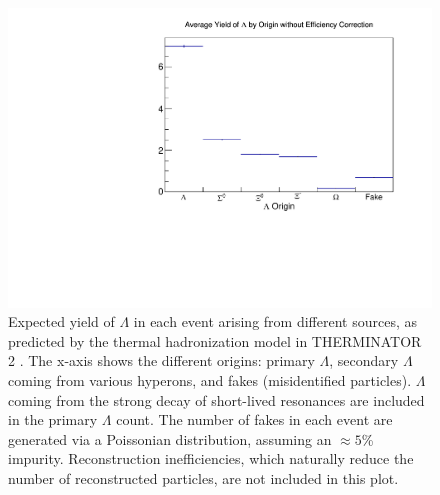 \begin{figure}[hbt]
\includegraphics[width=36pc]{Figures/YieldAndEff/2016-08-06-LambdaYieldsNoEfficiency.pdf}
\caption[$\Lambda$ yields from THERMINATOR 2 without efficiency corrections]{
Expected yield of $\Lambda$ in each event arising from different sources, as predicted by the thermal hadronization model in THERMINATOR 2 \cite{Chojnacki:2011hb}. The x-axis shows the different origins: primary $\Lambda$, secondary $\Lambda$ coming from various hyperons, and fakes (misidentified particles).  $\Lambda$ coming from the strong decay of short-lived resonances are included in the primary $\Lambda$ count. The number of fakes in each event are generated via a Poissonian distribution, assuming an $\approx 5$\% impurity. Reconstruction inefficiencies, which naturally reduce the number of reconstructed particles, are not included in this plot.
}
\label{fig:LambdaYieldsNoEfficiency}
\end{figure}


